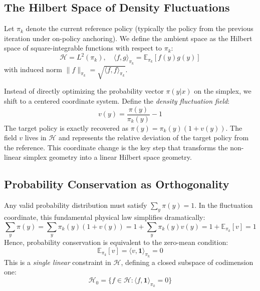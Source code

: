\documentclass[11pt]{article}
\theoremstyle{definition}
\theoremstyle{remark}
\newcommand{\E}{\mathbb{E}}
\newcommand{\pik}{\pi_k}
\begin{document}
\subsection{The Hilbert Space of Density Fluctuations}
\label{subsec:hilbert_space}

Let $\pik$ denote the current reference policy (typically the policy from the previous iteration under on-policy anchoring). We define the ambient space as the Hilbert space of square-integrable functions with respect to $\pik$:
\begin{equation}
    \mathcal{H} = L^2(\pik), \quad \langle f, g \rangle_{\pik} = \E_{\pik}[f(y)g(y)]
\end{equation}
with induced norm $\|f\|_{\pik} = \sqrt{\langle f, f \rangle_{\pik}}$.

Instead of directly optimizing the probability vector $\pi(y|x)$ on the simplex, we shift to a centered coordinate system. Define the \emph{density fluctuation field}:
\begin{equation}
\label{eq:fluctuation}
    v(y) = \frac{\pi(y)}{\pik(y)} - 1
\end{equation}
The target policy is exactly recovered as $\pi(y) = \pik(y)(1 + v(y))$. The field $v$ lives in $\mathcal{H}$ and represents the relative deviation of the target policy from the reference. This coordinate change is the key step that transforms the non-linear simplex geometry into a linear Hilbert space geometry.

\subsection{Probability Conservation as Orthogonality}
\label{subsec:conservation}

Any valid probability distribution must satisfy $\sum_y \pi(y) = 1$. In the fluctuation coordinate, this fundamental physical law simplifies dramatically:
\begin{equation}
    \sum_y \pi(y) = \sum_y \pik(y)(1 + v(y)) = 1 + \sum_y \pik(y) v(y) = 1 + \E_{\pik}[v] = 1
\end{equation}
Hence, probability conservation is equivalent to the zero-mean condition:
\begin{equation}
\label{eq:zero_mean}
    \E_{\pik}[v] = \langle v, \mathbf{1} \rangle_{\pik} = 0
\end{equation}
This is a \emph{single linear} constraint in $\mathcal{H}$, defining a closed subspace of codimension one:
\begin{equation}
\label{eq:H0}
    \mathcal{H}_0 = \{ f \in \mathcal{H} : \langle f, \mathbf{1} \rangle_{\pik} = 0 \}
\end{equation}
\end{document}
